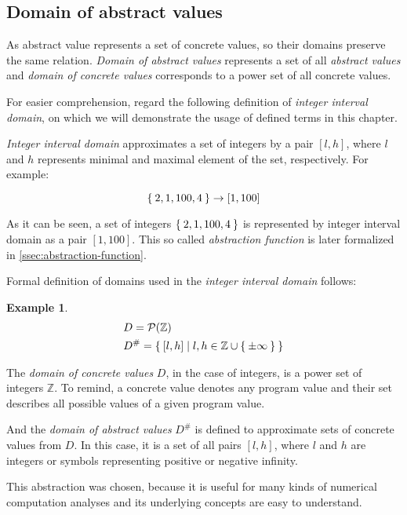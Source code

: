 \documentclass[12pt,oneside]{fithesis2}
\theoremstyle{definition}
\newtheorem{exmp}{Example}[section]
\begin{document}
\subsection{Domain of abstract values}

As abstract value represents a set of concrete values, so their domains preserve the same relation. \textit{Domain of abstract values} represents a set of all \textit{abstract values} and \textit{domain of concrete values} corresponds to a power set of all concrete values.

For easier comprehension, regard the following definition of \textit{integer interval domain}\cite{mine-WING12}, on which we will demonstrate the usage of defined terms in this chapter.

\textit{Integer interval domain} approximates a set of integers by a pair $[l, h]$, where $l$ and $h$ represents minimal and maximal element of the set, respectively. For example:

\[
  \Set{ 2, 1, 100, 4 } \to [1, 100]
\]

As it can be seen, a set of integers $\Set{2, 1, 100, 4}$ is represented by integer interval domain as a pair $[1, 100]$. This so called \textit{abstraction function} is later formalized in \ref{ssec:abstraction-function}.

Formal definition of domains used in the \textit{integer interval domain} follows:

\begin{exmp}
  \begin{align*}
    &D = \mathcal P(\mathbb Z)\\
    &D^\# = \Set{[l,h] | l,h \in \mathbb{Z} \cup \Set{\pm\infty}}\\
  \end{align*}
\end{exmp}

The \textit{domain of concrete values} $D$, in the case of integers, is a power set of integers $\mathbb Z$. To remind, a concrete value denotes any program value and their set describes all possible values of a given program value.

And the \textit{domain of abstract values} $D^\#$ is defined to approximate sets of concrete values from $D$. In this case, it is a set of all pairs $[l, h]$, where $l$ and $h$ are integers or symbols representing positive or negative infinity.

This abstraction was chosen, because it is useful for many kinds of numerical computation analyses\cite{mine-AIAA10} and its underlying concepts are easy to understand.
\end{document}
